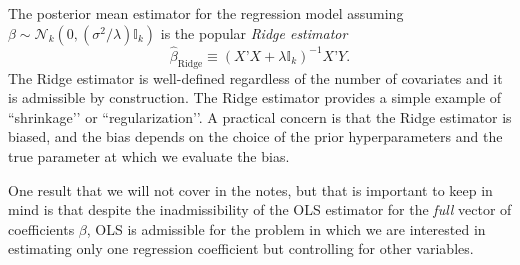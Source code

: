 \documentclass[11pt]{article} %
\begin{document}
The posterior mean estimator for the regression model assuming $\beta \sim \mathcal{N}_{k}(0 , (\sigma^2/ \lambda) \mathbb{I}_k )$ is the popular \emph{Ridge estimator}
\[ \widehat{\beta}_{\textrm{Ridge}} \equiv (X’X + \lambda \mathbb{I}_k)^{-1} X’Y. \]
The Ridge estimator is well-defined regardless of the number of covariates and it is admissible by construction. The Ridge estimator provides a simple example of ``shrinkage’’ or ``regularization’’. A practical concern is that the Ridge estimator is biased, and the bias depends on the choice of the prior hyperparameters and the true parameter at which we evaluate the bias.  

One result that we will not cover in the notes, but that is important to keep in mind is that despite the inadmissibility of the OLS estimator for the \emph{full} vector of coefficients $\beta$, OLS is admissible for the problem in which we are interested in estimating only one regression coefficient but controlling for other variables.   
\end{document}
